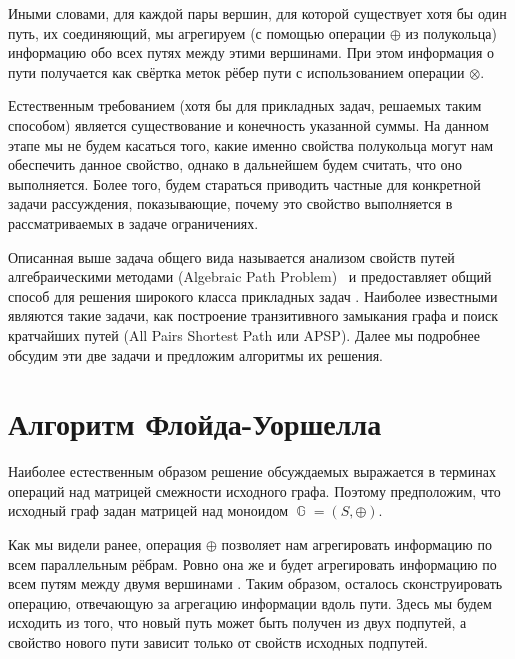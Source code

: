Иными словами, для каждой пары вершин, для которой существует хотя бы один путь, их соединяющий, мы агрегируем (с помощью операции $\oplus$ из полукольца) информацию обо всех путях между этими вершинами.
При этом информация о пути получается как свёртка меток рёбер пути с использованием операции $\otimes$.

Естественным требованием (хотя бы для прикладных задач, решаемых таким способом) является существование и конечность указанной суммы.
На данном этапе мы не будем касаться того, какие именно свойства полукольца могут нам обеспечить данное свойство, однако в дальнейшем будем считать, что оно выполняется.
Более того, будем стараться приводить частные для конкретной задачи рассуждения, показывающие, почему это свойство выполняется в рассматриваемых в задаче ограничениях.

Описанная выше задача общего вида называется анализом свойств путей алгебраическими методами (Algebraic Path Problem)~ и предоставляет общий способ для решения широкого класса прикладных задач%
.
Наиболее известными являются такие задачи, как построение транзитивного замыкания графа и поиск кратчайших путей (All Pairs Shortest Path или APSP).
Далее мы подробнее обсудим эти две задачи и предложим алгоритмы их решения.

\section{Алгоритм Флойда-Уоршелла}

Наиболее естественным образом решение обсуждаемых выражается в терминах операций над матрицей смежности исходного графа.
Поэтому предположим, что исходный граф задан матрицей над моноидом $\BbbG = (S,\oplus)$.

Как мы видели ранее, операция $\oplus$ позволяет нам агрегировать информацию по всем параллельным рёбрам.
Ровно она же и будет агрегировать информацию по всем путям между двумя вершинами%
.
Таким образом, осталось сконструировать операцию, отвечающую за агрегацию информации вдоль пути.
Здесь мы будем исходить из того, что новый путь может быть получен из двух подпутей, а свойство нового пути зависит только от свойств исходных подпутей.

